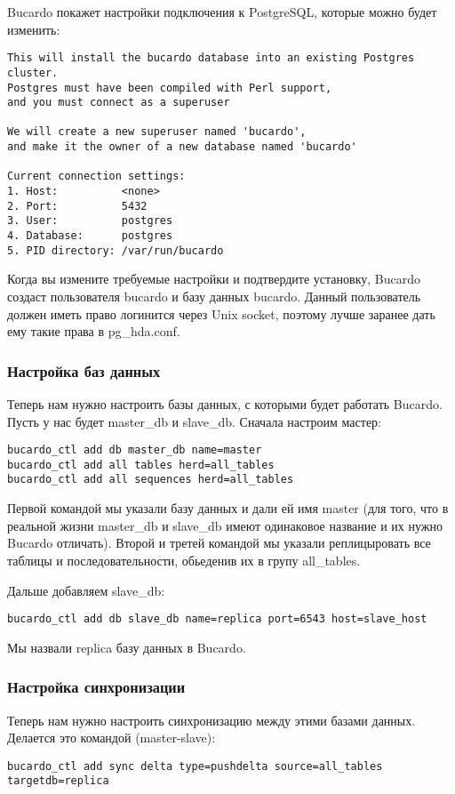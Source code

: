 Bucardo покажет настройки подключения к PostgreSQL, которые можно будет изменить:
\begin{lstlisting}[label=lst:bucardo6,caption=Инициализация Bucardo]
This will install the bucardo database into an existing Postgres cluster.
Postgres must have been compiled with Perl support,
and you must connect as a superuser

We will create a new superuser named 'bucardo',
and make it the owner of a new database named 'bucardo'

Current connection settings:
1. Host:          <none>
2. Port:          5432
3. User:          postgres
4. Database:      postgres
5. PID directory: /var/run/bucardo
\end{lstlisting}

Когда вы измените требуемые настройки и подтвердите установку, Bucardo создаст пользователя bucardo и базу данных bucardo.
Данный пользователь должен иметь право логинится через Unix socket, поэтому лучше заранее дать ему такие права в pg\_hda.conf.

\subsubsection{Настройка баз данных}
Теперь нам нужно настроить базы данных, с которыми будет работать Bucardo. 
Пусть у нас будет master\_db и slave\_db. Сначала настроим мастер:
\begin{lstlisting}[label=lst:bucardo7,caption=Настройка баз данных]
bucardo_ctl add db master_db name=master
bucardo_ctl add all tables herd=all_tables
bucardo_ctl add all sequences herd=all_tables
\end{lstlisting}

Первой командой мы указали базу данных и дали ей имя master (для того, что в реальной жизни master\_db и slave\_db 
имеют одинаковое название и их нужно Bucardo отличать). Второй и третей командой мы указали реплицыровать все 
таблицы и последовательности, обьеденив их в групу all\_tables.

Дальше добавляем slave\_db:
\begin{lstlisting}[label=lst:bucardo8,caption=Настройка баз данных]
bucardo_ctl add db slave_db name=replica port=6543 host=slave_host
\end{lstlisting}

Мы назвали replica базу данных в Bucardo.

\subsubsection{Настройка синхронизации}
Теперь нам нужно настроить синхронизацию между этими базами данных. Делается это командой (master-slave):
\begin{lstlisting}[label=lst:bucardo9,caption=Настройка синхронизации]
bucardo_ctl add sync delta type=pushdelta source=all_tables targetdb=replica
\end{lstlisting}

